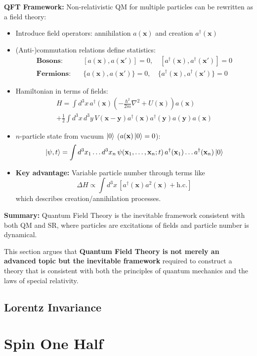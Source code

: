 \documentclass[12pt,a4paper]{article}
\numberwithin{equation}{subsection}
\begin{document}
\noindent\textbf{QFT Framework:} Non-relativistic QM for multiple particles can be rewritten as a field theory:
\begin{itemize}
    \item Introduce field operators: annihilation $a(\mathbf{x})$ and creation $a^\dagger(\mathbf{x})$
    \item (Anti-)commutation relations define statistics:
    \begin{align*}
        \textbf{Bosons:} \quad & [a(\mathbf{x}), a(\mathbf{x}')] = 0, \quad [a^\dagger(\mathbf{x}), a^\dagger(\mathbf{x}')] = 0 \\
        \textbf{Fermions:} \quad & \{a(\mathbf{x}), a(\mathbf{x}')\} = 0, \quad \{a^\dagger(\mathbf{x}), a^\dagger(\mathbf{x}')\} = 0
    \end{align*}
    \item Hamiltonian in terms of fields:
    \begin{align*}
        H = \int d^3x\, a^\dagger(\mathbf{x})\left(-\frac{\hbar^2}{2m}\nabla^2 + U(\mathbf{x})\right)a(\mathbf{x}) \\
        + \frac{1}{2}\int d^3x\, d^3y\, V(\mathbf{x}-\mathbf{y})a^\dagger(\mathbf{x})a^\dagger(\mathbf{y})a(\mathbf{y})a(\mathbf{x})
    \end{align*}
    \item $n$-particle state from vacuum $\ket{0}$ ($a(\mathbf{x})\ket{0} = 0$):
    \begin{equation}
    \ket{\psi,t} = \int d^3x_1 \ldots d^3x_n\, \psi(\mathbf{x}_1, \ldots, \mathbf{x}_n; t)\, a^\dagger(\mathbf{x}_1) \ldots a^\dagger(\mathbf{x}_n) \ket{0}
    \end{equation}
    \item \textbf{Key advantage:} Variable particle number through terms like
    \begin{equation}
    \Delta H \propto \int d^3x\, \left[ a^\dagger(\mathbf{x})a^2(\mathbf{x}) + \text{h.c.} \right]
    \end{equation}
    which describes creation/annihilation processes.
\end{itemize}

\noindent\textbf{Summary:} Quantum Field Theory is the inevitable framework consistent with both QM and SR, where particles are excitations of fields and particle number is dynamical.

This section argues that \textbf{Quantum Field Theory is not merely an advanced topic but the inevitable framework} required to construct a theory that is consistent with both the principles of quantum mechanics and the laws of special relativity.
\subsection{Lorentz Invariance}

\section{Spin One Half}
\end{document}
